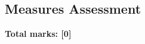 \documentclass[../s1]{subfiles}
\begin{document}
\subsection*{Measures Assessment}
\thispagestyle{fancy}



\begin{flushright}
\textbf{Total marks: [0]}
\end{flushright}
\end{document}
